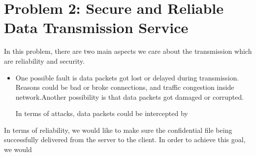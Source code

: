 \section{Problem 2: Secure and Reliable Data Transmission Service}

In this problem, there are two main aspects we care about the transmission which are
reliability and security.

\begin{itemize}

\item One possible fault is data packets got lost or delayed during transmission. Reasons could be bad or broke connections, and traffic congestion inside network.Another possibility is that data packets got damaged or corrupted.

In terms of attacks, data packets could be intercepted by




\end{itemize}


In terms of reliability, we would like to make sure the confidential file being successfully delivered from the server to the client. In order to achieve this goal, we would
